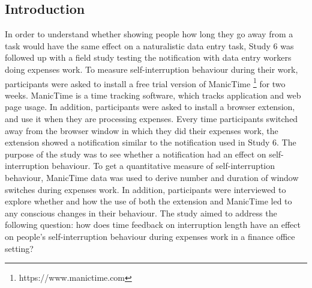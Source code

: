 \subsection{Introduction}
In order to understand whether showing people how long they go away from a task would have the same effect on a naturalistic data entry task, Study 6 was followed up with a field study testing the notification with data entry workers doing expenses work. To measure self-interruption behaviour during their work, participants were asked to install a free trial version of ManicTime \footnote{https://www.manictime.com} for two weeks. ManicTime is a time tracking software, which tracks application and web page usage. In addition, participants were asked to install a browser extension, and use it when they are processing expenses. Every time participants switched away from the browser window in which they did their expenses work, the extension showed a notification similar to the notification used in Study 6. The purpose of the study was to see whether a notification had an effect on self-interruption behaviour. To get a quantitative measure of self-interruption behaviour, ManicTime data was used to derive number and duration of window switches during expenses work. In addition, participants were interviewed to explore whether and how the use of both the extension and ManicTime led to any conscious changes in their behaviour. The study aimed to address the following question: how does time feedback on interruption length have an effect on people's self-interruption behaviour during expenses work in a finance office setting? 

